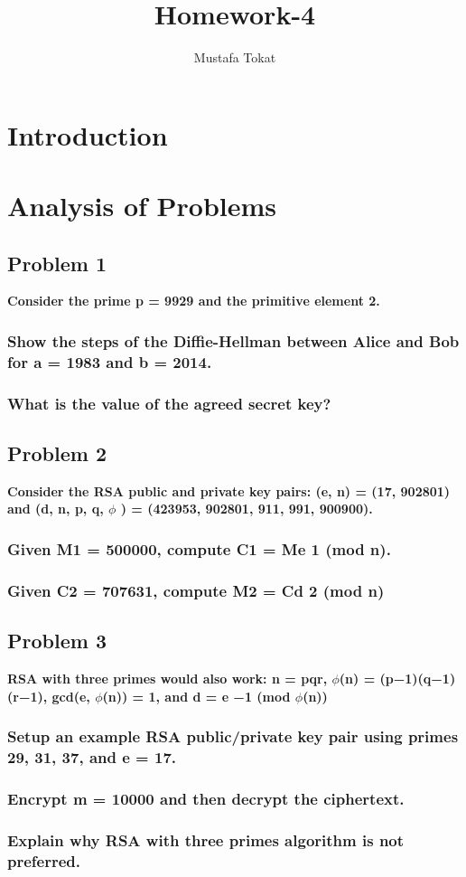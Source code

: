 \documentclass[11pt]{article}
\begin{document}
\title{Homework-4}
\author{Mustafa Tokat}
\maketitle
\section{Introduction}

\paragraph{}\section{Analysis of Problems}
\subsection{Problem 1} \textbf{Consider the prime p = 9929 and the primitive element 2.}
\subsubsection{\textbf{Show the steps of the Diffie-Hellman between Alice and Bob for a = 1983 and b = 2014.}}
\subsubsection{\textbf{What is the value of the agreed secret key?}}

\subsection{Problem 2} \textbf{Consider the RSA public and private key pairs: (e, n) = (17, 902801) and (d, n, p, q, $\phi $ ) =
(423953, 902801, 911, 991, 900900).}
\subsubsection{\textbf{Given M1 = 500000, compute C1 = Me 1 (mod n).}}
\subsubsection{\textbf{Given C2 = 707631, compute M2 = Cd 2 (mod n)}}


\subsection{Problem 3} \textbf{RSA with three primes would also work: n = pqr, $\phi $(n) = (p−1)(q−1)(r−1), gcd(e, $\phi $(n)) = 1,
and d = e −1 (mod $\phi $(n))}
\subsubsection{\textbf{Setup an example RSA public/private key pair using primes 29, 31, 37, and e = 17.}}
\subsubsection{\textbf{Encrypt m = 10000 and then decrypt the ciphertext.}}
\subsubsection{\textbf{Explain why RSA with three primes algorithm is not preferred.}}
\end{document}
